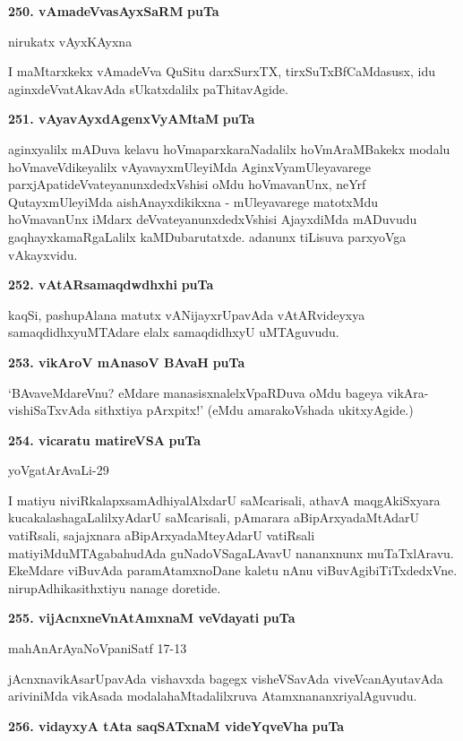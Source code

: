 \medskip
\noindent
\textbf{250. vAmadeVvasAyxSaRM} \hfill{\bf puTa \pageref{112}}

\hfill{nirukatx vAyxKAyxna}

\smallskip
I maMtarxkekx vAmadeVva QuSitu darxSurxTX, tirxSuTxBfCaMdasusx, idu aginx\-deVvatAkavAda sUkatxdalilx paThita\-vAgide.

\medskip
\noindent
\textbf{251. vAyavAyxdAgenxVyAMtaM} \hfill{\bf puTa \pageref{208}}

\smallskip
aginxyalilx mADuva kelavu hoVmaparxkaraNadalilx hoVmAraMBakekx modalu hoVmaveVdikeyalilx vAyavayxmUleyiMda AginxVyamUleyavarege parxjA\-patideVvateyanunxdedxVshisi oMdu hoVmavanUnx, neYrf QutayxmUleyiMda aishAnayxdikikxna - mUleyavarege matotxMdu hoVmavanUnx iMdarx deVvateya\-nunxdedxVshisi AjayxdiMda mADuvudu gaqhayxkamaRgaLalilx kaMDubarutatxde. adanunx tiLisuva parxyoVga vAkayx\-vidu.

\medskip
\noindent
\textbf{252. vAtARsamaqdwdhxhi} \hfill{\bf puTa \pageref{90}}

\smallskip
kaqSi, pashupAlana matutx vANijayxrUpavAda vAtARvideyxya samaqdidhx\-yuMTAdare elalx samaq\-didhxyU uMTAguvudu.

\medskip
\noindent
\textbf{253. vikAroV mAnasoV BAvaH} \hfill{\bf puTa \pageref{230}}

\smallskip
`BAvaveMdareVnu? eMdare manasisxnalelxVpaRDuva oMdu bageya vikAra-vishiSaTxvAda sithxtiya pArxpitx!' \-(eMdu amarakoVshada ukitxyAgide.)

\medskip
\noindent
\textbf{254. vicaratu matireVSA} \hfill{\bf puTa \pageref{257}}

\hfill{yoVgatArAvaLi-29}

\smallskip
I matiyu niviRkalapxsamAdhiyalAlxdarU saMcarisali, athavA maqgA\-kiSxyara kucakalashagaLalilxyA\-darU saMcarisali, pAmarara aBipArxyadaMtAdarU vatiR\-sali, sajajxnara aBipArxyadaMteyAdarU vatiRsali matiyiMduMTAgabahudAda guNa\-doVSagaLAvavU nananxnunx muTaTxlAravu. EkeMdare viBuvAda paramAtamxnoDane kaletu nAnu viBuvAgibiTiTxdedxVne. nirupAdhikasithxtiyu nanage doretide.

\medskip
\noindent
\textbf{255. vijAcnxneVnAtAmxnaM veVdayati} \hfill{\bf puTa \pageref{21}}

\hfill{mahAnArAyaNoVpaniSatf 17-13}

\smallskip
jAcnxnavikAsarUpavAda vishavxda bagegx visheVSavAda viveVcanAyutavAda ariviniMda vikAsada modalahaMtadalilxruva AtamxnananxriyalAguvudu.

\medskip
\noindent
\textbf{256. vidayxyA tAta saqSATxnaM videYqveVha} \hfill{\bf puTa \pageref{86}}

